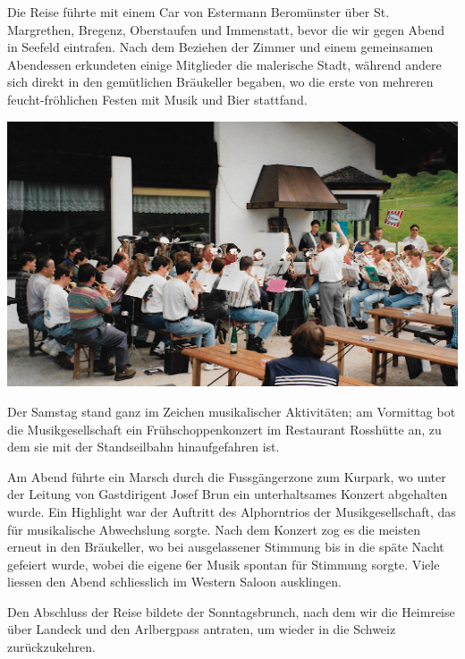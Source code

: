 \begin{history}
    Die Reise führte mit einem Car von Estermann Beromünster über St.
    Margrethen, Bregenz, Oberstaufen und Immenstatt, bevor die wir gegen Abend
    in Seefeld eintrafen. Nach dem Beziehen der Zimmer und einem gemeinsamen
    Abendessen erkundeten einige Mitglieder die malerische Stadt, während andere
    sich direkt in den gemütlichen Bräukeller begaben, wo die erste von mehreren
    feucht-fröhlichen Festen mit Musik und Bier stattfand.

    \begin{MulticolFigure}
        \centering
        \includegraphics[width=0.93\linewidth]{./chap/1975-2000/1997/MGH-Ausflug-Seefeld-1997-1.jpg}
    \end{MulticolFigure}

    Der Samstag stand ganz im Zeichen musikalischer Aktivitäten; am Vormittag
    bot die Musikgesellschaft ein Frühschoppenkonzert im Restaurant Rosshütte
    an, zu dem sie mit der Standseilbahn hinaufgefahren ist.

    Am Abend führte ein
    Marsch durch die Fussgängerzone zum Kurpark, wo unter der Leitung von
    Gastdirigent Josef Brun ein unterhaltsames Konzert abgehalten wurde. Ein
    Highlight war der Auftritt des Alphorntrios der Musikgesellschaft, das für
    musikalische Abwechslung sorgte. Nach dem Konzert zog es die meisten erneut
    in den Bräukeller, wo bei ausgelassener Stimmung bis in die späte Nacht
    gefeiert wurde, wobei die eigene 6er Musik spontan für Stimmung sorgte.
    Viele liessen den Abend schliesslich im Western Saloon ausklingen.


    Den Abschluss der Reise bildete der Sonntagsbrunch, nach dem wir die
    Heimreise über Landeck und den Arlbergpass antraten, um wieder in die
    Schweiz zurückzukehren.


\end{history}
